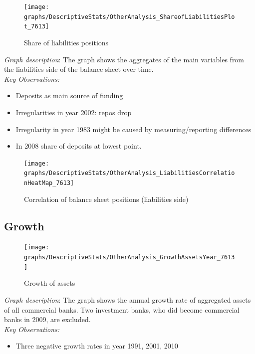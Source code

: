 \documentclass[12pt, a4paper]{article} %
\begin{document}
\newpage

\begin{figure}[hbtp]
\centering
\caption{Share of liabilities positions}
\texttt{[image: graphs/DescriptiveStats/OtherAnalysis\_ShareofLiabilitiesPlot\_7613]}
\end{figure}


\noindent \textit{Graph description}: The graph shows the aggregates of the main variables from the liabilities side of the balance sheet over time.\\

\noindent \textit{Key Observations:}
\begin{itemize}
\item Deposits as main source of funding
\item Irregularities in year 2002: repos drop
\item Irregularity in year 1983 might be caused by measuring/reporting differences
\item In 2008 share of deposits at lowest point.

\end{itemize}



\begin{figure}[hbtp]
\centering
\caption{Correlation of balance sheet positions (liabilities side)}
\texttt{[image: graphs/DescriptiveStats/OtherAnalysis\_LiabilitiesCorrelationHeatMap\_7613]}
\end{figure}

\subsection{Growth}


\begin{figure}[hbtp]
\centering
\caption{Growth of assets}
\texttt{[image: graphs/DescriptiveStats/OtherAnalysis\_GrowthAssetsYear\_7613]}
\end{figure}

\noindent \textit{Graph description}: The graph shows the annual growth rate of aggregated assets of all commercial banks. Two investment banks, who did become commercial banks in 2009, are excluded. \\

\noindent \textit{Key Observations:}
\begin{itemize}
\item Three negative growth rates in year 1991, 2001, 2010
\end{itemize}
\end{document}
